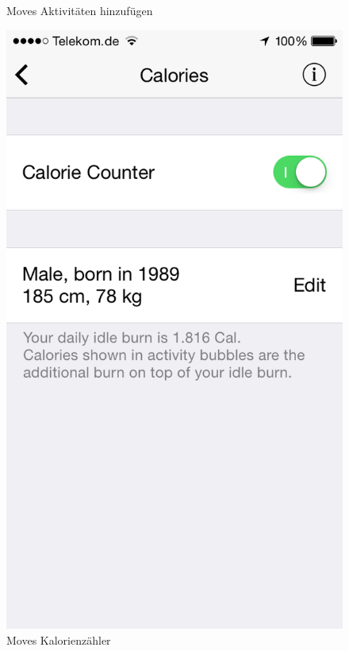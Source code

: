 \begin{figure}[H]
\begin{minipage}[t]{0.47\textwidth}
    \caption{\small{Moves Aktivitäten hinzufügen \cite{fig:SportActivity}}}
    \label{fig:SportActivity}
  \end{minipage}
  \begin{minipage}[t]{0.47\textwidth}
    \centering
    \includegraphics[scale=0.3]{images/moves-app-calories.png}   
    \caption{\small{Moves Kalorienzähler \cite{fig:Calories}}}
    \label{fig:Calories}
  \end{minipage}
\end{figure}

